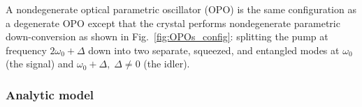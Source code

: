 
A nondegenerate optical parametric oscillator (OPO) is the same configuration as a degenerate OPO except that the crystal performs nondegenerate parametric down-conversion as shown in Fig.~\ref{fig:OPOs_config}: splitting the pump at frequency $2\omega_0+\Delta$ down into two separate, squeezed, and entangled modes at $\omega_0$ (the signal) and $\omega_0+\Delta,\; \Delta\neq0$ (the idler). %

\subsubsection{Analytic model}

